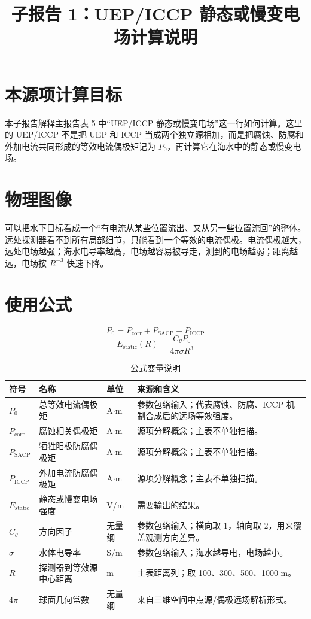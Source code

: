 \documentclass[UTF8,a4paper,11pt]{ctexart}
\title{子报告 1：UEP/ICCP 静态或慢变电场计算说明}
\author{}
\date{}
\begin{document}
\maketitle

\section{本源项计算目标}
本子报告解释主报告表 5 中“UEP/ICCP 静态或慢变电场”这一行如何计算。这里的 UEP/ICCP 不是把 UEP 和 ICCP 当成两个独立源相加，而是把腐蚀、防腐和外加电流共同形成的等效电流偶极矩记为 $P_0$，再计算它在海水中的静态或慢变电场。

\section{物理图像}
可以把水下目标看成一个“有电流从某些位置流出、又从另一些位置流回”的整体。远处探测器看不到所有局部细节，只能看到一个等效的电流偶极。电流偶极越大，远处电场越强；海水电导率越高，电场越容易被导走，测到的电场越弱；距离越远，电场按 $R^{-3}$ 快速下降。

\section{使用公式}
\[
P_0=P_{\mathrm{corr}}+P_{\mathrm{SACP}}+P_{\mathrm{ICCP}}
\]
\[
E_{\mathrm{static}}(R)=\frac{C_\theta P_0}{4\pi\sigma R^3}
\]

\begin{longtable}{p{2.6cm}p{3.2cm}p{2.2cm}p{5.5cm}}
\caption{公式变量说明}\\
\toprule
符号 & 名称 & 单位 & 来源和含义\\
\midrule
$P_0$ & 总等效电流偶极矩 & A$\cdot$m & 参数包络输入；代表腐蚀、防腐、ICCP 机制合成后的远场等效强度。\\
$P_{\mathrm{corr}}$ & 腐蚀相关偶极矩 & A$\cdot$m & 源项分解概念；主表不单独扫描。\\
$P_{\mathrm{SACP}}$ & 牺牲阳极防腐偶极矩 & A$\cdot$m & 源项分解概念；主表不单独扫描。\\
$P_{\mathrm{ICCP}}$ & 外加电流防腐偶极矩 & A$\cdot$m & 源项分解概念；主表不单独扫描。\\
$E_{\mathrm{static}}$ & 静态或慢变电场强度 & V/m & 需要输出的结果。\\
$C_\theta$ & 方向因子 & 无量纲 & 参数包络输入；横向取 1，轴向取 2，用来覆盖观测方向差异。\\
$\sigma$ & 水体电导率 & S/m & 参数包络输入；海水越导电，电场越小。\\
$R$ & 探测器到等效源中心距离 & m & 主表距离列；取 100、300、500、1000 m。\\
$4\pi$ & 球面几何常数 & 无量纲 & 来自三维空间中点源/偶极远场解析形式。\\
\bottomrule
\end{longtable}
\end{document}

